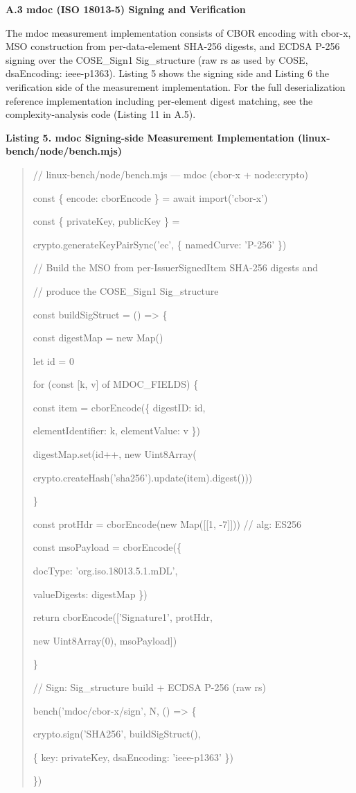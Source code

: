 \textbf{A.3 mdoc (ISO 18013-5) Signing and Verification}

The mdoc measurement implementation consists of CBOR encoding with cbor-x, MSO construction from per-data-element SHA-256 digests, and ECDSA P-256 signing over the COSE\_Sign1 Sig\_structure (raw r\textbar\textbar s as used by COSE, dsaEncoding: ieee-p1363). Listing 5 shows the signing side and Listing 6 the verification side of the measurement implementation. For the full deserialization reference implementation including per-element digest matching, see the complexity-analysis code (Listing 11 in A.5).

\textbf{Listing 5. mdoc Signing-side Measurement Implementation (linux-bench/node/bench.mjs)}

\begin{quote}
// linux-bench/node/bench.mjs --- mdoc (cbor-x + node:crypto)

const \{ encode: cborEncode \} = await import('cbor-x')

const \{ privateKey, publicKey \} =

crypto.generateKeyPairSync('ec', \{ namedCurve: 'P-256' \})

// Build the MSO from per-IssuerSignedItem SHA-256 digests and

// produce the COSE\_Sign1 Sig\_structure

const buildSigStruct = () =\textgreater{} \{

const digestMap = new Map()

let id = 0

for (const {[}k, v{]} of MDOC\_FIELDS) \{

const item = cborEncode(\{ digestID: id,

elementIdentifier: k, elementValue: v \})

digestMap.set(id++, new Uint8Array(

crypto.createHash('sha256').update(item).digest()))

\}

const protHdr = cborEncode(new Map({[}{[}1, -7{]}{]})) // alg: ES256

const msoPayload = cborEncode(\{

docType: 'org.iso.18013.5.1.mDL',

valueDigests: digestMap \})

return cborEncode({[}'Signature1', protHdr,

new Uint8Array(0), msoPayload{]})

\}

// Sign: Sig\_structure build + ECDSA P-256 (raw r\textbar\textbar s)

bench('mdoc/cbor-x/sign', N, () =\textgreater{} \{

crypto.sign('SHA256', buildSigStruct(),

\{ key: privateKey, dsaEncoding: 'ieee-p1363' \})

\})
\end{quote}

